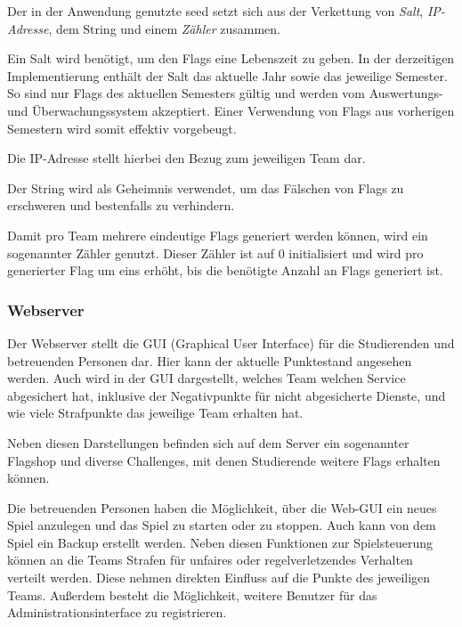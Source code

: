 Der in der Anwendung genutzte seed setzt sich aus der Verkettung von \textit{Salt}, \textit{IP-Adresse}, dem String  und einem \textit{Zähler} zusammen.

Ein Salt wird benötigt, um den Flags eine Lebenszeit zu geben. In der derzeitigen Implementierung enthält der Salt das aktuelle Jahr sowie das jeweilige Semester. So sind nur Flags des aktuellen Semesters gültig und werden vom Auswertungs- und Überwachungssystem akzeptiert. Einer Verwendung von Flags aus vorherigen Semestern wird somit effektiv vorgebeugt.

Die IP-Adresse stellt hierbei den Bezug zum jeweiligen Team dar.

Der String  wird als Geheimnis verwendet, um das Fälschen von Flags zu erschweren und bestenfalls zu verhindern.

Damit pro Team mehrere eindeutige Flags generiert werden können, wird ein sogenannter Zähler genutzt. Dieser Zähler ist auf 0 initialisiert und wird pro generierter Flag um eins erhöht, bis die benötigte Anzahl an Flags generiert ist. \cite[S.48]{sosnaKonzeptionUndRealisierung2010}

\subsubsection{Webserver}\label{subsubsec:Webserver}

Der Webserver stellt die GUI (Graphical User Interface) für die Studierenden und betreuenden Personen dar. Hier kann der aktuelle Punktestand angesehen werden. Auch wird in der GUI dargestellt, welches Team welchen Service abgesichert hat, inklusive der Negativpunkte für nicht abgesicherte Dienste, und wie viele Strafpunkte das jeweilige Team erhalten hat.

Neben diesen Darstellungen befinden sich auf dem Server ein sogenannter Flagshop und diverse Challenges, mit denen Studierende weitere Flags erhalten können.

Die betreuenden Personen haben die Möglichkeit, über die Web-GUI ein neues Spiel anzulegen und das Spiel zu starten oder zu stoppen. Auch kann von dem Spiel ein Backup erstellt werden. Neben diesen Funktionen zur Spielsteuerung können an die Teams Strafen für unfaires oder regelverletzendes Verhalten verteilt werden. Diese nehmen direkten Einfluss auf die Punkte des jeweiligen Teams. Außerdem besteht die Möglichkeit, weitere Benutzer für das Administrationsinterface zu registrieren.

